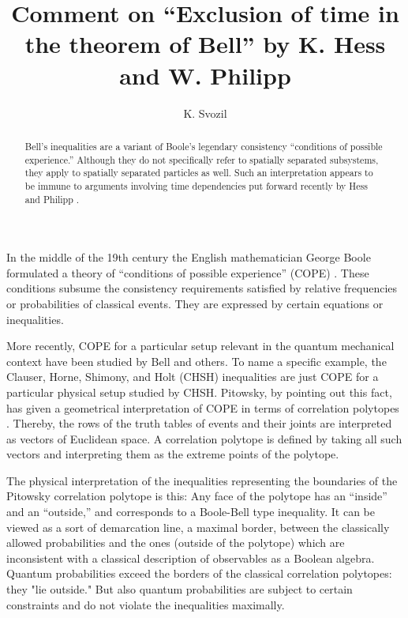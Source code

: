 \documentclass{epl}
\title{Comment on ``{E}xclusion of time in the theorem of {B}ell'' by {K}.
  {H}ess and {W}. {P}hilipp}
\author{K. Svozil\inst{1}}
\institute{
  \inst{1} Institut f\"ur Theoretische Physik, University of Technology Vienna,
Wiedner Hauptstra\ss e 8-10/136, A-1040 Vienna, Austria
}
\begin{document}
\maketitle

\begin{abstract}
Bell's inequalities are a variant of Boole's legendary
consistency ``conditions of possible experience.''
Although they do not specifically refer to spatially
separated subsystems, they apply to spatially separated particles as well.
Such an interpretation appears to be immune to arguments involving time dependencies
put forward recently by Hess and Philipp \cite{Hess&Philipp2002}.
\end{abstract}


In the middle of the 19th century the English mathematician George Boole
formulated a theory of ``conditions of possible experience'' (COPE)
\cite{Boole,Boole-62,Pit-94}.
These conditions subsume the consistency requirements
satisfied by relative frequencies or probabilities of
classical events.
They are expressed by certain equations or inequalities.

More recently, COPE for a particular setup relevant in the
quantum mechanical context have been studied by Bell and others.
To name a specific example, the Clauser, Horne, Shimony, and Holt (CHSH) inequalities are just COPE for a particular
physical setup studied by CHSH.
Pitowsky, by pointing out this fact,  has given a geometrical interpretation
of COPE in terms of correlation polytopes
\cite{pitowsky}.
Thereby, the rows of the truth tables of events and their joints are interpreted
as vectors of Euclidean space.
A correlation polytope is defined by taking all such vectors and interpreting them as
the extreme points of the polytope.


The physical interpretation of the inequalities representing the boundaries of the
Pitowsky correlation polytope is  this:
Any face of the polytope has an ``inside'' and an ``outside,''
and corresponds to a Boole-Bell type inequality.
It can be viewed as a sort of demarcation line,
a maximal border, between the classically allowed probabilities
and the ones (outside of the polytope) which are inconsistent
with a classical description
of observables as a Boolean algebra.
Quantum probabilities exceed the borders of the classical correlation
polytopes: they "lie outside."
But also quantum probabilities are subject to certain constraints
and do not violate
the inequalities maximally.
\end{document}
